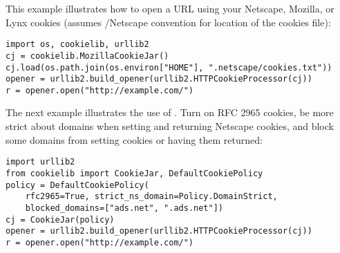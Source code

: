 This example illustrates how to open a URL using your Netscape,
Mozilla, or Lynx cookies (assumes \UNIX{}/Netscape convention for
location of the cookies file):

\begin{verbatim}
import os, cookielib, urllib2
cj = cookielib.MozillaCookieJar()
cj.load(os.path.join(os.environ["HOME"], ".netscape/cookies.txt"))
opener = urllib2.build_opener(urllib2.HTTPCookieProcessor(cj))
r = opener.open("http://example.com/")
\end{verbatim}

The next example illustrates the use of .
Turn on RFC 2965 cookies, be more strict about domains when setting
and returning Netscape cookies, and block some domains from setting
cookies or having them returned:

\begin{verbatim}
import urllib2
from cookielib import CookieJar, DefaultCookiePolicy
policy = DefaultCookiePolicy(
    rfc2965=True, strict_ns_domain=Policy.DomainStrict,
    blocked_domains=["ads.net", ".ads.net"])
cj = CookieJar(policy)
opener = urllib2.build_opener(urllib2.HTTPCookieProcessor(cj))
r = opener.open("http://example.com/")
\end{verbatim}
